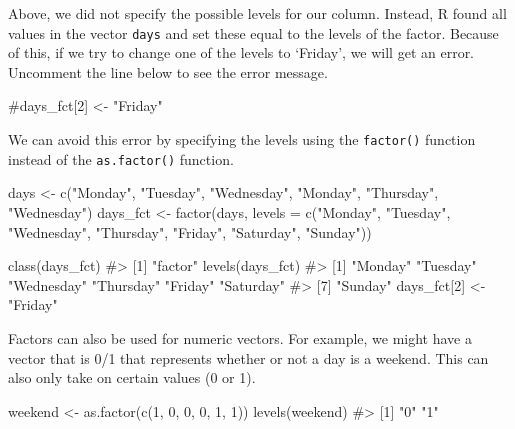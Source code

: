 \documentclass[
  letterpaper,
]{krantz}
\makeatletter
\newenvironment{Shaded}{\begin{snugshade}}{\end{snugshade}}
\newcommand{\AttributeTok}[1]{\textcolor[rgb]{0.40,0.45,0.13}{#1}}
\newcommand{\CommentTok}[1]{\textcolor[rgb]{0.37,0.37,0.37}{#1}}
\newcommand{\DecValTok}[1]{\textcolor[rgb]{0.68,0.00,0.00}{#1}}
\newcommand{\FunctionTok}[1]{\textcolor[rgb]{0.28,0.35,0.67}{#1}}
\newcommand{\NormalTok}[1]{\textcolor[rgb]{0.00,0.23,0.31}{#1}}
\newcommand{\OtherTok}[1]{\textcolor[rgb]{0.00,0.23,0.31}{#1}}
\newcommand{\StringTok}[1]{\textcolor[rgb]{0.13,0.47,0.30}{#1}}
\newenvironment{kframe}{%
\medskip{}
\setlength{\fboxsep}{.8em}
 \def\at@end@of@kframe{}%
 \ifinner\ifhmode%
  \def\at@end@of@kframe{\end{minipage}}%
  \begin{minipage}{\columnwidth}%
 \fi\fi%
 \def\FrameCommand##1{\hskip\@totalleftmargin \hskip-\fboxsep
 \colorbox{shadecolor}{##1}\hskip-\fboxsep
     \hskip-\linewidth \hskip-\@totalleftmargin \hskip\columnwidth}%
 \MakeFramed {\advance\hsize-\width
   \@totalleftmargin\z@ \linewidth\hsize
   \@setminipage}}%
 {\par\unskip\endMakeFramed%
 \at@end@of@kframe}
\renewenvironment{Shaded}{\begin{kframe}}{\end{kframe}}
\makeatother
\begin{document}
Above, we did not specify the possible levels for our column. Instead, R
found all values in the vector \texttt{days} and set these equal to the
levels of the factor. Because of this, if we try to change one of the
levels to `Friday', we will get an error. Uncomment the line below to
see the error message.

\begin{Shaded}
\begin{Highlighting}[]
\CommentTok{\#days\_fct[2] \textless{}{-} "Friday"   }
\end{Highlighting}
\end{Shaded}

We can avoid this error by specifying the levels using the
\texttt{factor()} function instead of the \texttt{as.factor()} function.

\begin{Shaded}
\begin{Highlighting}[]
\NormalTok{days }\OtherTok{\textless{}{-}} \FunctionTok{c}\NormalTok{(}\StringTok{"Monday"}\NormalTok{, }\StringTok{"Tuesday"}\NormalTok{, }\StringTok{"Wednesday"}\NormalTok{, }\StringTok{"Monday"}\NormalTok{, }\StringTok{"Thursday"}\NormalTok{, }\StringTok{"Wednesday"}\NormalTok{)}
\NormalTok{days\_fct }\OtherTok{\textless{}{-}} \FunctionTok{factor}\NormalTok{(days, }
               \AttributeTok{levels =} \FunctionTok{c}\NormalTok{(}\StringTok{"Monday"}\NormalTok{, }\StringTok{"Tuesday"}\NormalTok{, }\StringTok{"Wednesday"}\NormalTok{, }\StringTok{"Thursday"}\NormalTok{, }
                          \StringTok{"Friday"}\NormalTok{, }\StringTok{"Saturday"}\NormalTok{, }\StringTok{"Sunday"}\NormalTok{))}

\FunctionTok{class}\NormalTok{(days\_fct)}
\CommentTok{\#\textgreater{} [1] "factor"}
\FunctionTok{levels}\NormalTok{(days\_fct)}
\CommentTok{\#\textgreater{} [1] "Monday"    "Tuesday"   "Wednesday" "Thursday"  "Friday"    "Saturday" }
\CommentTok{\#\textgreater{} [7] "Sunday"}
\NormalTok{days\_fct[}\DecValTok{2}\NormalTok{] }\OtherTok{\textless{}{-}} \StringTok{"Friday"}
\end{Highlighting}
\end{Shaded}

Factors can also be used for numeric vectors. For example, we might have
a vector that is 0/1 that represents whether or not a day is a weekend.
This can also only take on certain values (0 or 1).

\begin{Shaded}
\begin{Highlighting}[]
\NormalTok{weekend }\OtherTok{\textless{}{-}} \FunctionTok{as.factor}\NormalTok{(}\FunctionTok{c}\NormalTok{(}\DecValTok{1}\NormalTok{, }\DecValTok{0}\NormalTok{, }\DecValTok{0}\NormalTok{, }\DecValTok{0}\NormalTok{, }\DecValTok{1}\NormalTok{, }\DecValTok{1}\NormalTok{))}
\FunctionTok{levels}\NormalTok{(weekend)}
\CommentTok{\#\textgreater{} [1] "0" "1"}
\end{Highlighting}
\end{Shaded}
\end{document}
